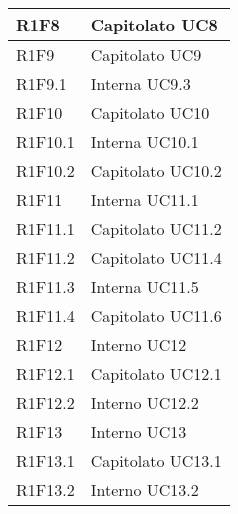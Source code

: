 \begin{center}
\begin{longtable}{|p{22mm}|p{22mm}|}
	\hline
R1F8	& 
	Capitolato \newline
	UC8
\\
\hline	
R1F9	& 
	Capitolato \newline
	UC9
\\
\hline	
R1F9.1	& 
	Interna \newline
	UC9.3
\\
\hline
R1F10	& 
	Capitolato \newline
	UC10
\\
\hline
R1F10.1	& 
	Interna \newline
	UC10.1
\\
\hline	
R1F10.2	& 
	Capitolato \newline
	UC10.2
\\
\hline
R1F11	& 
	Interna \newline
	UC11.1
\\
\hline
R1F11.1	& 
	Capitolato \newline
	UC11.2
\\
\hline
R1F11.2	& 
	Capitolato \newline
	UC11.4
\\
\hline
R1F11.3	& 
	Interna \newline
	UC11.5
\\
\hline
R1F11.4	& 
	Capitolato \newline
	UC11.6
\\
\hline
R1F12	& 
		Interno \newline
		UC12
\\
	\hline
R1F12.1	& 
		Capitolato \newline
		UC12.1 \\
	\hline
R1F12.2	& 
		Interno \newline
		UC12.2
\\
	\hline
R1F13	& 
		Interno \newline
		UC13
\\
	\hline
R1F13.1		& 
	Capitolato \newline
	UC13.1	
	\\
	\hline
R1F13.2	& 
	Interno \newline
	UC13.2	
	\\
	

\end{longtable}
\end{center}
